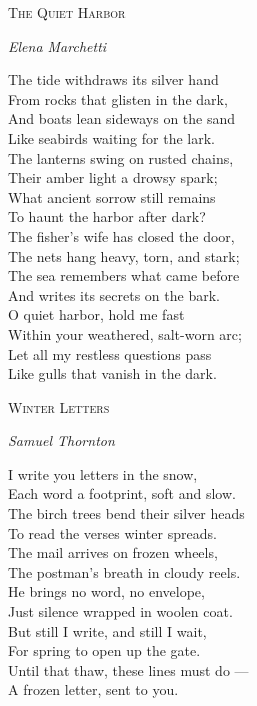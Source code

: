 \documentclass[12pt,a4paper]{article}
\newenvironment{poem}[2]{%
  \begin{center}
  {\Large\scshape\color{poetrynavy}#1\par}
  \vspace{0.4\baselineskip}
  {\itshape\color{poetrynavy!70}#2\par}
  \end{center}
  \vspace{1.5\baselineskip}
  \begin{center}
  \begin{minipage}{0.72\textwidth}
  \setlength{\parindent}{0pt}
  \setlength{\parskip}{0pt}
  \color{poetrynavy!85}
  \onehalfspacing
}{%
  \end{minipage}
  \end{center}
}
\begin{document}
\begin{poem}{The Quiet Harbor}{Elena Marchetti}
The tide withdraws its silver hand\\
From rocks that glisten in the dark,\\
And boats lean sideways on the sand\\
Like seabirds waiting for the lark.\\[1.5\baselineskip]

The lanterns swing on rusted chains,\\
Their amber light a drowsy spark;\\
What ancient sorrow still remains\\
To haunt the harbor after dark?\\[1.5\baselineskip]

The fisher's wife has closed the door,\\
The nets hang heavy, torn, and stark;\\
The sea remembers what came before\\
And writes its secrets on the bark.\\[1.5\baselineskip]

O quiet harbor, hold me fast\\
Within your weathered, salt-worn arc;\\
Let all my restless questions pass\\
Like gulls that vanish in the dark.
\end{poem}

\vspace*{\fill}

\newpage


\thispagestyle{fancy}
\vspace*{\fill}

\begin{poem}{Winter Letters}{Samuel Thornton}
I write you letters in the snow,\\
Each word a footprint, soft and slow.\\
The birch trees bend their silver heads\\
To read the verses winter spreads.\\[1.5\baselineskip]

The mail arrives on frozen wheels,\\
The postman's breath in cloudy reels.\\
He brings no word, no envelope,\\
Just silence wrapped in woolen coat.\\[1.5\baselineskip]

But still I write, and still I wait,\\
For spring to open up the gate.\\
Until that thaw, these lines must do ---\\
A frozen letter, sent to you.
\end{poem}
\end{document}
